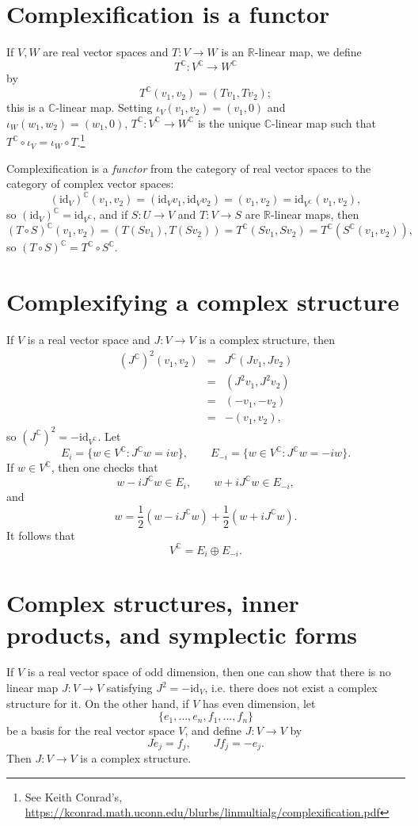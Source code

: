 \documentclass{article}
\newcommand{\id}{\textrm{id}}
\begin{document}
\section{Complexification is a functor}
If $V,W$ are real vector spaces and $T:V \to W$ is an $\mathbb{R}$-linear map, we define 
\[
T^\mathbb{C}:V^\mathbb{C} \to W^\mathbb{C}
\]
by 
\[
T^\mathbb{C}(v_1,v_2)=(Tv_1,Tv_2);
\]
this is a $\mathbb{C}$-linear map.
Setting $\iota_V(v_1,v_2)=(v_1,0)$ and $\iota_W(w_1,w_2)=(w_1,0)$, $T^\mathbb{C}:V^\mathbb{C} \to W^\mathbb{C}$ is
the unique $\mathbb{C}$-linear map
such that
$T^\mathbb{C} \circ \iota_V = \iota_W \circ T$.\footnote{See Keith Conrad's, \url{https://kconrad.math.uconn.edu/blurbs/linmultialg/complexification.pdf}}


Complexification is a {\em  functor} from the category of real vector spaces to the category of complex vector spaces: 
\[
(\id_V)^\mathbb{C}(v_1,v_2)=(\id_V v_1, \id_V v_2)=(v_1,v_2)=\id_{V^\mathbb{C}}(v_1,v_2),
\]
so $(\id_V)^\mathbb{C}=\id_{V^\mathbb{C}}$, and if $S:U \to V$ and $T:V \to S$ are $\mathbb{R}$-linear maps, then 
\[
(T \circ S)^\mathbb{C}(v_1,v_2)=(T(Sv_1),T(Sv_2))=
T^\mathbb{C}(Sv_1,Sv_2)=T^\mathbb{C}(S^\mathbb{C}(v_1,v_2)),
\]
so $(T \circ S)^\mathbb{C} =  T^\mathbb{C} \circ
S^\mathbb{C}$.




\section{Complexifying a complex structure}
If $V$ is a real vector space and $J:V \to V$ is a complex structure, then
\begin{eqnarray*}
(J^\mathbb{C})^2(v_1,v_2)&=&J^\mathbb{C}(Jv_1,Jv_2)\\
&=&(J^2v_1,J^2v_2)\\
&=&(-v_1,-v_2)\\
&=&-(v_1,v_2),
\end{eqnarray*}
so $(J^\mathbb{C})^2=-\id_{V^\mathbb{C}}$. 
Let
\[
E_i=\{w \in V^\mathbb{C}:J^\mathbb{C}w=iw\}, \qquad E_{-i}=\{w \in V^\mathbb{C}:
J^\mathbb{C}w=-iw\}.
\]
If $w \in V^\mathbb{C}$, then one checks that
\[
w-iJ^\mathbb{C} w \in E_i, \qquad w+iJ^\mathbb{C}w \in E_{-i},
\]
and 
\[
w=\frac{1}{2}\left(w-iJ^\mathbb{C} w\right)+\frac{1}{2}\left(w+iJ^\mathbb{C}w\right).
\]
It follows that
\[
V^\mathbb{C}=E_i \oplus E_{-i}.
\]


\section{Complex structures, inner products, and symplectic forms}
If $V$ is a real vector space of odd dimension, then one can show that there is no linear map $J:V \to V$ satisfying $J^2=-\id_V$, i.e.
there does not exist a complex structure for it. On the other hand, if $V$ has even dimension,
let
\[
\{e_1,\ldots,e_n,f_1,\ldots,f_n\}
\]
be a basis for the real vector space $V$, and define $J:V \to V$ by
\[
Je_j = f_j, \qquad Jf_j=-e_j.
\]
Then $J:V \to V$ is a complex structure.
\end{document}
